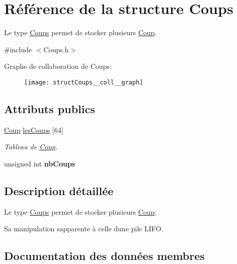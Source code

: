 \hypertarget{structCoups}{}\section{Référence de la structure Coups}
\label{structCoups}


Le type \hyperlink{structCoups}{Coups} permet de stocker plusieurs \hyperlink{structCoup}{Coup}.  




{\ttfamily \#include $<$Coups.\+h$>$}



Graphe de collaboration de Coups\+:
\nopagebreak
\begin{figure}[H]
\begin{center}
\leavevmode
\texttt{[image: structCoups\_\_coll\_\_graph]}
\end{center}
\end{figure}
\subsection*{Attributs publics}
\begin{DoxyCompactItemize}
\item 
\hyperlink{structCoup}{Coup} \hyperlink{structCoups_a97059148e0c9d3bee730b80a0f5c7982}{les\+Coups} \mbox{[}64\mbox{]}
\begin{DoxyCompactList}\small\item\em Tableau de \hyperlink{structCoup}{Coup}. \end{DoxyCompactList}\item 
\mbox{\label{structCoups_a177e8255aeb9b85cd6ebf8e4cc64407f}} 
unsigned int {\bfseries nb\+Coups}
\end{DoxyCompactItemize}


\subsection{Description détaillée}
Le type \hyperlink{structCoups}{Coups} permet de stocker plusieurs \hyperlink{structCoup}{Coup}. 

Sa manipulation s\textquotesingle{}apparente à celle d\textquotesingle{}une pile L\+I\+FO. 

\subsection{Documentation des données membres}
\mbox{\label{structCoups_a97059148e0c9d3bee730b80a0f5c7982}} 

